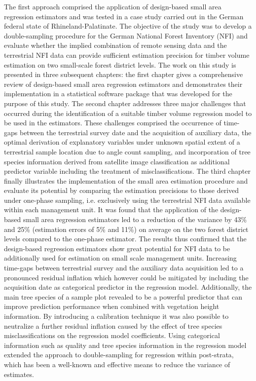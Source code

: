The first approach comprised the application of design-based small area regression estimators and was tested in a case study carried out in the German federal state of Rhineland-Palatinate. The objective of the study was to develop a double-sampling procedure for the German National Forest Inventory (NFI) and evaluate whether the implied combination of remote sensing data and the terrestrial NFI data can provide sufficient estimation precision for timber volume estimation on two small-scale forest district levels. The work on this study is presented in three subsequent chapters: the first chapter gives a comprehensive review of design-based small area regression estimators and demonstrates their implementation in a statistical software package that was developed for the purpose of this study. The second chapter addresses three major challenges that occurred during the identification of a suitable timber volume regression model to be used in the estimators. These challenges comprised the occurrence of time-gaps between the terrestrial survey date and the acquisition of auxiliary data, the optimal derivation of explanatory variables under unknown spatial extent of a terrestrial sample location due to angle count sampling, and incorporation of tree species information derived from satellite image classification as additional predictor variable including the treatment of misclassifications. The third chapter finally illustrates the implementation of the small area estimation procedure and evaluate its potential by comparing the estimation precisions to those derived under one-phase sampling, i.e. exclusively using the terrestrial NFI data available within each management unit. It was found that the application of the design-based small area regression estimators led to a reduction of the variance by 43\% and 25\% (estimation errors of 5\% and 11\%) on average on the two forest district levels compared to the one-phase estimator. The results thus confirmed that the design-based regression estimators show great potential for NFI data to be additionally used for estimation on small scale management units. Increasing time-gaps between terrestrial survey and the auxiliary data acquisition led to a pronounced residual inflation which however could be mitigated by including the acquisition date as categorical predictor in the regression model. Additionally, the main tree species of a sample plot revealed to be a powerful predictor that can improve prediction performance when combined with vegetation height information. By introducing a calibration technique it was also possible to neutralize a further residual inflation caused by the effect of tree species misclassifications on the regression model coefficients. Using categorical information such as quality and tree species information in the regression model extended the approach to double-sampling for regression within post-strata, which has been a well-known and effective means to reduce the variance of estimates.\par

